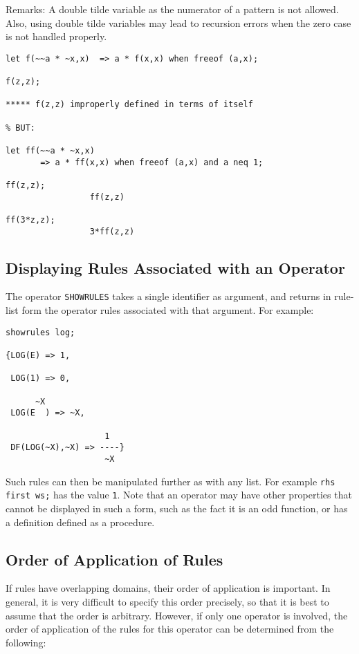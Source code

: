 Remarks: A double tilde variable as the numerator of a pattern is not allowed.
Also, using double tilde variables may lead to recursion errors when the
zero case is not handled properly.
\begin{verbatim}
let f(~~a * ~x,x)  => a * f(x,x) when freeof (a,x);

f(z,z);

***** f(z,z) improperly defined in terms of itself

% BUT:

let ff(~~a * ~x,x)
       => a * ff(x,x) when freeof (a,x) and a neq 1;

ff(z,z);
                 ff(z,z)

ff(3*z,z);
                 3*ff(z,z)
\end{verbatim}

\subsection*{Displaying Rules Associated with an Operator}
\hypertarget{operator:SHOWRULES}{}

The operator \texttt{SHOWRULES} takes a single identifier
as argument, and returns in rule-list form the operator rules associated
with that argument.  For example:
\begin{verbatim}
showrules log;

{LOG(E) => 1,

 LOG(1) => 0,

      ~X
 LOG(E  ) => ~X,

                    1
 DF(LOG(~X),~X) => ----}
                    ~X
\end{verbatim}

Such rules can then be manipulated further as with any list.  For example
\texttt{rhs first ws;} has the value \texttt{1}.  Note that an operator may
have other properties that cannot be displayed in such a form, such as the
fact it is an odd function, or has a definition defined as a procedure.

\subsection*{Order of Application of Rules}

If rules have overlapping domains, their order of application is
important.  In general, it is very difficult to specify this order
precisely, so that it is best to assume that the order is arbitrary.
However, if only one operator is involved, the order of application of the
rules for this operator can be determined from the following:

